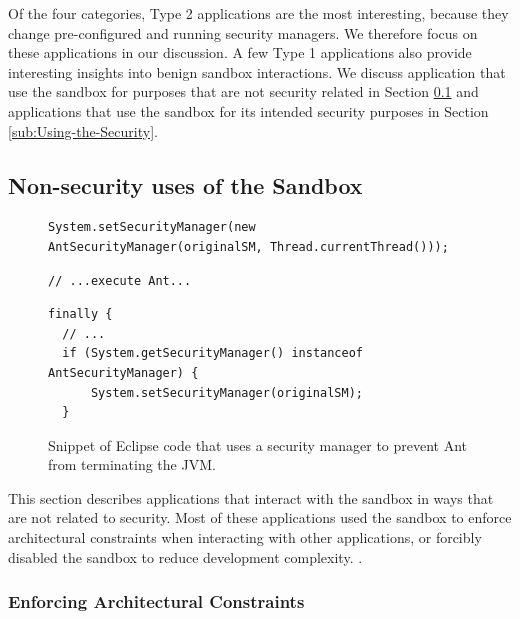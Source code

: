 \documentclass{sig-alternate}
\begin{document}
Of the four categories, Type 2 applications are the most interesting, because
they change pre-configured and running security managers.  We therefore focus
on these applications in our discussion. A few Type 1
applications also provide interesting insights into
benign sandbox interactions. We discuss application that use the sandbox for
purposes that are not security related in Section \ref{sub:Non-security-uses-of}
and applications that use the sandbox for its intended security purposes in
Section \ref{sub:Using-the-Security}.

\subsection{Non-security uses of the Sandbox}\label{sub:Non-security-uses-of}

\begin{figure}
\begin{lstlisting}[firstnumber=691]
System.setSecurityManager(new AntSecurityManager(originalSM, Thread.currentThread()));
\end{lstlisting}
\vspace{-0.3cm}
\begin{lstlisting}[firstnumber=703]
// ...execute Ant...
\end{lstlisting}
\vspace{-0.3cm}
\begin{lstlisting}[firstnumber=723]
finally {
  // ...
  if (System.getSecurityManager() instanceof AntSecurityManager) { 
      System.setSecurityManager(originalSM); 
  }
\end{lstlisting}\vspace{-0.3cm}
\caption{Snippet of Eclipse code that uses a security manager to prevent Ant\label{fig:Eclipse-snippet}
from terminating the JVM.}
\end{figure}

This section describes applications that interact with the sandbox in ways that
are not related to security. Most of these applications used the
sandbox to enforce architectural constraints when interacting with
other applications, or forcibly disabled the sandbox to reduce development
complexity.  .

\subsubsection{Enforcing Architectural Constraints}
\end{document}
